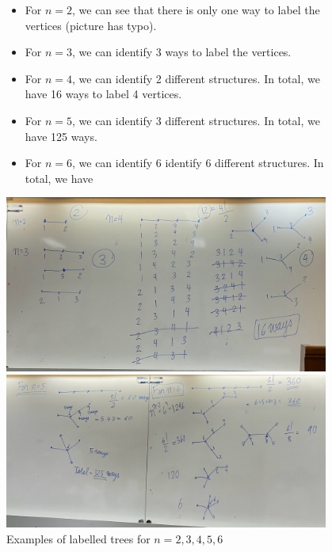 \begin{figure}[ht]
\begin{nexample}
  \phantom{omo}

  \begin{itemize}
    \item For \(n=2\), we can see that there is only one way to label the vertices
      (picture has typo). 
    \item For \(n=3\), we can identify 3 ways to label the vertices.
    \item For \(n=4\), we can identify 2 different structures. In total, we have 16
      ways to label 4 vertices.
    \item For \(n=5\), we can identify 3 different structures. In total, we have 125
      ways.
    \item For \(n=6\), we can identify 6 identify 6 different structures. In total, we
      have 
  \end{itemize}

  \begin{center}
    \includegraphics[width=0.95\textwidth]{figures/l05/label1}

    \includegraphics[width=0.95\textwidth]{figures/l05/label2}
  \end{center}
  \caption{Examples of labelled trees for \(n=2,3,4,5,6\)}\label{fig:label-examples}
\end{nexample}
\end{figure}
